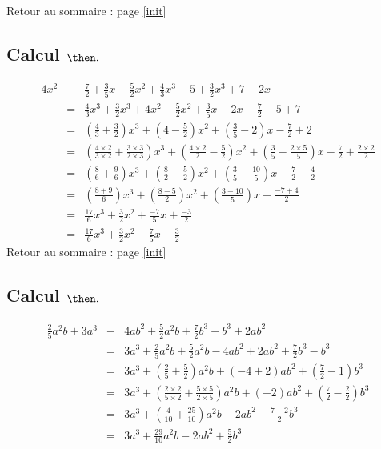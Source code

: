 \documentclass[14pt]{article}
\theoremstyle{remark}
\newcounter{n}
\renewcommand{\it}{Retour au sommaire : page \ref{init}
	\subsection{Calcul $ \mathbf{ \then}.$}\label{\then} \stepcounter{n} }
\theoremstyle{plain}
\begin{document}
\it \begin{eqnarray*} 4x^2 &-& \frac72 + \frac35x - \frac52x^2 + \frac43 x^3 - 5 + \frac32 x^3 + 7 - 2x
\\ &=&  \frac43 x^3+ \frac32 x^3 + 4x^2- \frac52x^2
+ \frac35x- 2x-\frac72-5+7\\
&=&  \left(\frac43 +\frac32\right) x^3 + \left(4- \frac52\right)x^2
+ \left(\frac35- 2\right)x-\frac72+2\\
&=&  \left(\frac{4\times2}{3\times2} +\frac{3\times3}{2\times3}\right) x^3 + \left(\frac{4\times2}2- \frac52\right)x^2
+ \left(\frac35- \frac{2\times5}5\right)x-\frac72+\frac{2\times2}2\\
&=&  \left(\frac{8}{6} +\frac{9}{6}\right) x^3 + \left(\frac{8}2- \frac52\right)x^2
+ \left(\frac35- \frac{10}5\right)x-\frac72+\frac{4}2\\
&=&  \left(\frac{8+9}{6}\right) x^3 + \left(\frac{8-5}2\right)x^2
+ \left(\frac{3-10}5\right)x+\frac{-7+4}2\\
&=&  \frac{17}{6} x^3 + \frac{3}2x^2
+ \frac{-7}5x+\frac{-3}2\\
&=&  \frac{17}{6} x^3 + \frac{3}2x^2
- \frac{7}5x-\frac{3}2\end{eqnarray*}
\it 
\begin{eqnarray*}\frac25 a^2b + 3a^3 &-& 4ab^2 + \frac52 a^2b + \frac72b^3 - b^3 + 2ab^2\\
&=& 3a^3+\frac25a^2b+\frac52a^2b-4ab^2+2ab^2+\frac72b^3-b^3\\
&=& 3a^3+\left(\frac25+\frac52\right)a^2b
+(-4+2)ab^2+\left(\frac72-1\right)b^3\\
&=& 3a^3 + \left(\frac{2\times2}{5\times2}+\frac{5\times5}{2\times5}\right)a^2b + (-2)ab^2+\left(\frac72-\frac22\right)b^3\\
&=& 3a^3+\left(\frac{4}{10}+\frac{25}{10}\right)a^2b
-2ab^2+\frac{7-2}2b^3\\
&=& 3a^3+\frac{29}{10}a^2b-2ab^2+\frac52b^3\end{eqnarray*}
  
\end{document}
